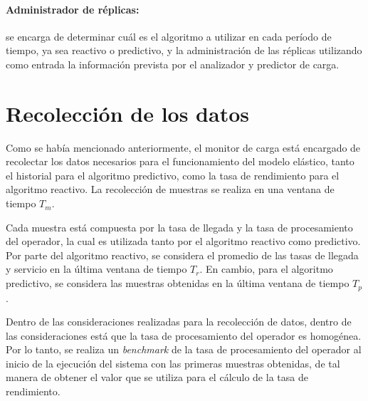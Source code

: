 \paragraph{Administrador de r\'eplicas:} se encarga de determinar cu\'al es el algoritmo a utilizar en cada per\'iodo de tiempo, ya sea reactivo o predictivo, y la administraci\'on de las r\'eplicas utilizando como entrada la informaci\'on prevista por el analizador y predictor de carga.


\section{Recolecci\'on de los datos}

Como se hab\'ia mencionado anteriormente, el monitor de carga est\'a encargado de recolectar los datos necesarios para el funcionamiento del modelo el\'astico, tanto el historial para el algoritmo predictivo, como la tasa de rendimiento para el algoritmo reactivo. La recolecci\'on de muestras se realiza en una ventana de tiempo $T_m$.


\normalsize{Cada muestra est\'a compuesta por la tasa de llegada y la tasa de procesamiento del operador, la cual es utilizada tanto por el algoritmo reactivo como predictivo. Por parte del algoritmo reactivo, se considera el promedio de las tasas de llegada y servicio en la \'ultima ventana de tiempo $T_r$. En cambio, para el algoritmo predictivo, se considera las muestras obtenidas en la \'ultima ventana de tiempo $T_p$.

Dentro de las consideraciones realizadas para la recolecci\'on de datos, dentro de las consideraciones est\'a que la tasa de procesamiento del operador es homog\'enea. Por lo tanto, se realiza un \textit{benchmark} de la tasa de procesamiento del operador al inicio de la ejecuci\'on del sistema con las primeras muestras obtenidas, de tal manera de obtener el valor que se utiliza para el c\'alculo de la tasa de rendimiento.}

